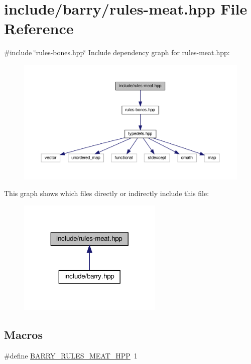 \hypertarget{rules-meat_8hpp}{}\section{include/barry/rules-\/meat.hpp File Reference}
\label{rules-meat_8hpp}
{\ttfamily \#include \char`\"{}rules-\/bones.\+hpp\char`\"{}}\newline
Include dependency graph for rules-\/meat.hpp\+:\nopagebreak
\begin{figure}[H]
\begin{center}
\leavevmode
\includegraphics[width=350pt]{rules-meat_8hpp__incl}
\end{center}
\end{figure}
This graph shows which files directly or indirectly include this file\+:\nopagebreak
\begin{figure}[H]
\begin{center}
\leavevmode
\includegraphics[width=196pt]{rules-meat_8hpp__dep__incl}
\end{center}
\end{figure}
\subsection*{Macros}
\begin{DoxyCompactItemize}
\item 
\#define \hyperlink{barry_8hpp_a22467d89c9ad7e30386746c050a39478}{B\+A\+R\+R\+Y\+\_\+\+R\+U\+L\+E\+S\+\_\+\+M\+E\+A\+T\+\_\+\+H\+PP}~1
\end{DoxyCompactItemize}


